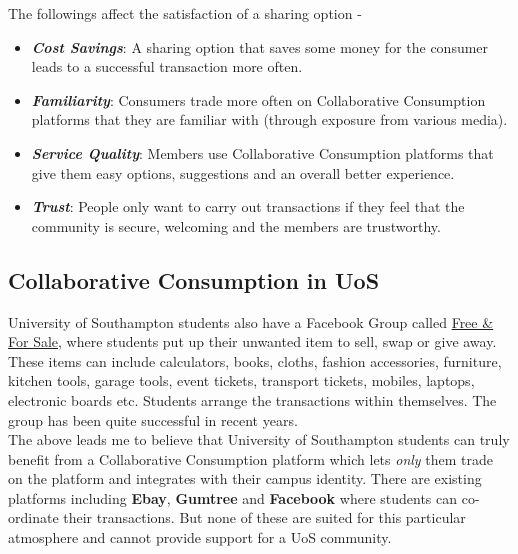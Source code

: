 The followings affect the satisfaction of a sharing option \cite{Mohlmann:2015}-
\begin{itemize}

	\item \textbf{\textit{Cost Savings}}: A sharing option that saves some money for the consumer leads to a successful transaction more often.
	
	\item \textbf{\textit{Familiarity}}: Consumers trade more often on Collaborative Consumption platforms that they are familiar with (through exposure from various media).
	
	\item \textbf{\textit{Service Quality}}: Members use Collaborative Consumption platforms that give them easy options, suggestions and an overall better experience.
	
	\item \textbf{\textit{Trust}}: People only want to carry out transactions if they feel that the community is secure, welcoming and the members are trustworthy.
	
\end{itemize}

\subsection{Collaborative Consumption in UoS}
University of Southampton students also have a Facebook Group called \href{https://www.facebook.com/groups/302702106480967/?fref=ts}{Free \& For Sale}, where students put up their unwanted item to sell, swap or give away. These items can include calculators, books, cloths, fashion accessories, furniture, kitchen tools, garage tools, event tickets, transport tickets, mobiles, laptops, electronic boards etc. Students arrange the transactions within themselves. The group has been quite successful in recent years.\\

The above leads me to believe that University of Southampton students can truly benefit from a Collaborative Consumption platform which lets \textit{only} them trade on the platform and integrates with their campus identity. There are existing platforms including \textbf{Ebay}, \textbf{Gumtree} and \textbf{Facebook} where students can co-ordinate their transactions. But none of these are suited for this particular atmosphere and cannot provide support for a UoS community.




